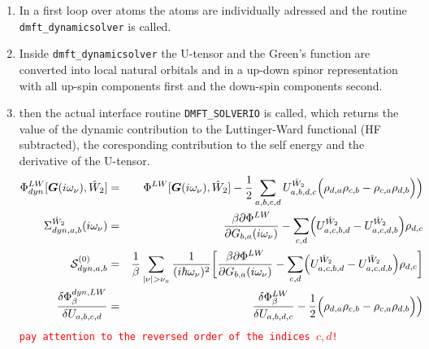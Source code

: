 \documentclass[11pt,a4paper]{report}
\newcommand{\petertt}[1]{\textcolor{red}{\texttt{#1}}}
\begin{document}
\begin{enumerate}
  \begin{enumerate}
    \item In a first loop over atoms the atoms are individually
      adressed and the routine \verb|dmft_dynamicsolver| is
      called. 
    \item Inside \verb|dmft_dynamicsolver| the U-tensor and the
      Green's function are converted into local natural orbitals and
      in a up-down spinor representation with all up-spin components
      first and the down-spin components second.
    \item then the actual interface routine \verb|DMFT_SOLVERIO| is
      called, which returns the value of the dynamic contribution to
      the Luttinger-Ward functional (HF subtracted), the coresponding
      contribution to the self energy and the derivative of the
      U-tensor.
      \begin{eqnarray}
      \Phi^{LW}_{dyn}[\mat{G}(i\omega_\nu),\hat{W}_2]&=&
      \Phi^{LW}[\mat{G}(i\omega_\nu),\hat{W}_2] -\frac{1}{2}
      \sum_{a,b,c,d} U^{\hat{W}_2}_{a,b,d,c} \Bigl(
      \rho_{d,a}\rho_{c,b} - \rho_{c,a}\rho_{d,b}\Bigr) \Bigr) 
      \nonumber\\\
      \Sigma^{\hat{W}_2}_{dyn,a,b}(i\omega_\nu)&=&
      \frac{\beta\partial\Phi^{LW}}{\partial G_{b,a}(i\omega_\nu)}
      -\sum_{c,d}\Bigl(U^{\hat{W}_2}_{a,c,b,d}-U^{\hat{W}_2}_{a,c,d,b}\Bigr)
      \rho_{d,c}
      \nonumber\\
      \mathcal{\mat{S}}^{(0)}_{dyn,a,b}
       &=&\frac{1}{\beta}\sum_{|\nu|>\nu_x}
       \frac{1}{(i\hbar\omega_\nu)^2}\biggl[
       \frac{\beta\partial\Phi^{LW}}{\partial G_{b,a}(i\omega_\nu)}
      -\sum_{c,d}\Bigl(U^{\hat{W}_2}_{a,c,b,d}-U^{\hat{W}_2}_{a,c,d,b}\Bigr)
      \rho_{d,c}\biggr]
      \nonumber\\
      \frac{\delta\Phi^{dyn,LW}_\beta}{\delta U_{a,b,c,d}}&=&
      \frac{\delta\Phi^{LW}_\beta}{\delta U_{a,b,d,c}}
      -\frac{1}{2}\Bigl(
      \rho_{d,a}\rho_{c,b} - \rho_{c,a}\rho_{d,b}\Bigr) \Bigr) 
      \end{eqnarray}
      \petertt{pay attention to the reversed order of the indices
        $c,d$!}  


\end{enumerate}
\end{enumerate}
\end{document}
